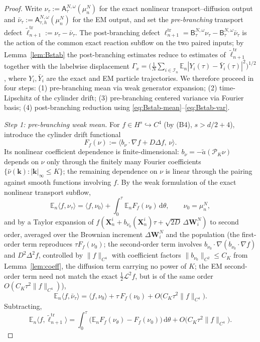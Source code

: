 \documentclass[a4paper,fleqn]{cas-sc}
\theoremstyle{definition}
\theoremstyle{remark}
\begin{document}
\begin{proof}
Write $\nu_\tau:=\mathsf A^{N,\omega}_\tau(\mu^N_n)$ for the exact nonlinear
transport--diffusion output and $\bar\nu_\tau:=\mathsf A^{N,\omega}_{\tau,h}(\mu^N_n)$
for the EM output, and set the \emph{pre-branching} transport defect
$\tilde\ell^{\mathrm{tr}}_{n+1}:=\nu_\tau-\bar\nu_\tau$. The post-branching defect
$\ell^{\mathrm{tr}}_{n+1}=\mathsf B^{N,\omega}_\tau\nu_\tau
-\mathsf B^{N,\omega}_\tau\bar\nu_\tau$ is the action of the common exact reaction
subflow on the two paired inputs; by Lemma~\ref{lem:Bstab} the post-branching
estimates reduce to estimates of $\tilde\ell^{\mathrm{tr}}_{n+1}$ together with the
labelwise displacement
$\Gamma_x=\bigl(\frac1N\sum_{i\in\mathcal I_n}\mathbb E_n|Y_i(\tau)-\bar Y_i(\tau)|^2\bigr)^{1/2}$,
where $Y_i,\bar Y_i$ are the exact and EM particle trajectories. We therefore
proceed in four steps: (1) pre-branching mean via weak generator expansion;
(2) time-Lipschitz of the cylinder drift; (3) pre-branching centered variance
via Fourier basis; (4) post-branching reduction using
\eqref{eq:Bstab-mean}--\eqref{eq:Bstab-var}.

\emph{Step 1: pre-branching weak mean.} For $f\in H^s\hookrightarrow C^4$ (by
(B4), $s>d/2+4$), introduce the cylinder drift functional
\[
F_f(\nu):=\langle b_\nu\!\cdot\!\nabla f+D\Delta f,\,\nu\rangle.
\]
Its nonlinear coefficient dependence is finite-dimensional: $b_\nu=-\tilde a(\mathcal P_K\nu)$
depends on $\nu$ only through the finitely many Fourier coefficients
$\{\hat\nu(\mathbf k):|\mathbf k|_\infty\le K\}$; the remaining dependence on
$\nu$ is linear through the pairing against smooth functions involving $f$. By
the weak formulation of the exact nonlinear transport subflow,
\[
\mathbb E_n\langle f,\nu_\tau\rangle=\langle f,\nu_0\rangle
+\int_0^\tau\mathbb E_nF_f(\nu_\theta)\,\mathrm d\theta,
\qquad\nu_0=\mu^N_n,
\]
and by a Taylor expansion of $f(\mathbf X^i_n+b_{\nu_0}(\mathbf X^i_n)\tau
+\sqrt{2D}\,\Delta\mathbf W^N_i)$ to second order, averaged over the Brownian
increment $\Delta\mathbf W^N_i$ and the population (the first-order term
reproduces $\tau F_f(\nu_0)$; the second-order term involves
$b_{\nu_0}\!\cdot\!\nabla(b_{\nu_0}\!\cdot\!\nabla f)$ and $D^2\Delta^2 f$,
controlled by $\|f\|_{C^4}$ with coefficient factors $\|b_{\nu_0}\|_{C^2}\le C_K$
from Lemma~\ref{lem:coeff}, the diffusion term carrying no power of $K$; the EM
second-order term need not match the exact $\tfrac12\mathcal L^2f$, but is of the
same order $O(C_K\tau^2\|f\|_{C^4})$),
\[
\mathbb E_n\langle f,\bar\nu_\tau\rangle=\langle f,\nu_0\rangle+\tau\,F_f(\nu_0)
+O\bigl(C_K\tau^2\|f\|_{C^4}\bigr).
\]
Subtracting,
\[
\mathbb E_n\langle f,\tilde\ell^{\mathrm{tr}}_{n+1}\rangle
=\int_0^\tau\bigl(\mathbb E_nF_f(\nu_\theta)-F_f(\nu_0)\bigr)\,\mathrm d\theta
+O\bigl(C_K\tau^2\|f\|_{C^4}\bigr).
\]


\end{proof}
\end{document}
